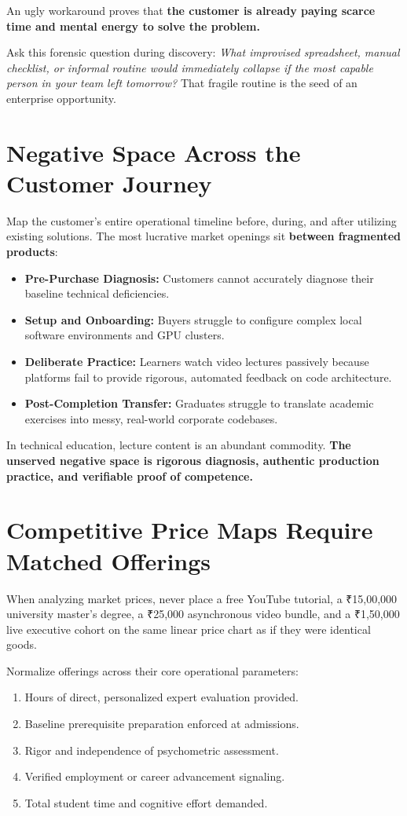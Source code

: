 An ugly workaround proves that \textbf{the customer is already paying scarce time and mental energy to solve the problem.}

Ask this forensic question during discovery: \textit{What improvised spreadsheet, manual checklist, or informal routine would immediately collapse if the most capable person in your team left tomorrow?} That fragile routine is the seed of an enterprise opportunity.

\section{Negative Space Across the Customer Journey}

Map the customer's entire operational timeline before, during, and after utilizing existing solutions. The most lucrative market openings sit \textbf{between fragmented products}:
\begin{itemize}[leftmargin=12pt,itemsep=1pt,topsep=1pt]
  \item \textbf{Pre-Purchase Diagnosis:} Customers cannot accurately diagnose their baseline technical deficiencies.
  \item \textbf{Setup and Onboarding:} Buyers struggle to configure complex local software environments and GPU clusters.
  \item \textbf{Deliberate Practice:} Learners watch video lectures passively because platforms fail to provide rigorous, automated feedback on code architecture.
  \item \textbf{Post-Completion Transfer:} Graduates struggle to translate academic exercises into messy, real-world corporate codebases.
\end{itemize}

In technical education, lecture content is an abundant commodity. \textbf{The unserved negative space is rigorous diagnosis, authentic production practice, and verifiable proof of competence.}

\section{Competitive Price Maps Require Matched Offerings}

When analyzing market prices, never place a free YouTube tutorial, a ₹15,00,000 university master's degree, a ₹25,000 asynchronous video bundle, and a ₹1,50,000 live executive cohort on the same linear price chart as if they were identical goods.

Normalize offerings across their core operational parameters:
\begin{enumerate}[leftmargin=12pt,itemsep=1pt,topsep=1pt,parsep=0pt]
  \item Hours of direct, personalized expert evaluation provided.
  \item Baseline prerequisite preparation enforced at admissions.
  \item Rigor and independence of psychometric assessment.
  \item Verified employment or career advancement signaling.
  \item Total student time and cognitive effort demanded.
\end{enumerate}


